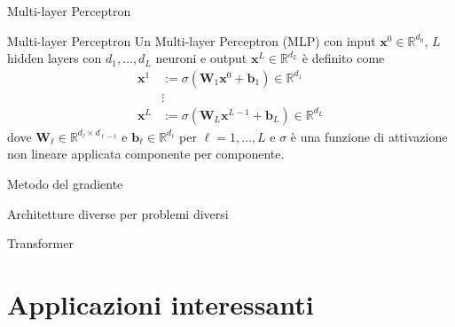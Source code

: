 \documentclass[aspectratio=169]{beamer}
\newcommand{\numberset}{\mathbb}
\newcommand{\R}{\numberset{R}}
\begin{document}
\begin{frame}{Multi-layer Perceptron}
 \begin{definition}{Multi-layer Perceptron}
  Un Multi-layer Perceptron (MLP) con input $\mathbf{x}^{0}\in \R^{d_{0}}$, $L$ hidden layers con $d_{1}, \ldots, d_{L}$ neuroni e output $\mathbf{x}^{L}\in \R^{d_{L}}$ è definito come
    \begin{align*}
     \mathbf{x}^{1} &:= \sigma\left( \mathbf{W}_{1} \mathbf{x}^{0} + \mathbf{b}_{1} \right) \in \R^{d_{1}} \\
     &\vdots \\
     \mathbf{x}^{L} &:= \sigma\left( \mathbf{W}_{L} \mathbf{x}^{L-1} + \mathbf{b}_{L} \right) \in \R^{d_{L}}
    \end{align*}
    dove $\mathbf{W}_{\ell}\in \R^{d_{\ell}\times d_{\ell-1}}$ e $\mathbf{b}_{\ell}\in \R^{d_{\ell}}$ per $\ell=1,\ldots, L$ e $\sigma$ è una funzione di attivazione non lineare applicata componente per componente.
 \end{definition}
\end{frame}

\begin{frame}{Metodo del gradiente}

\end{frame}

\begin{frame}{Architetture diverse per problemi diversi}

\end{frame}

\begin{frame}{Transformer}

\end{frame}

\section{Applicazioni interessanti}
\sectionpage
\end{document}
